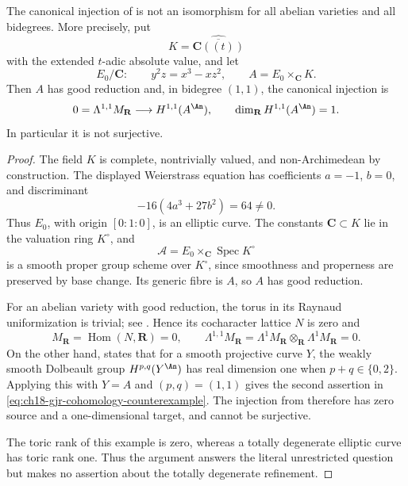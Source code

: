 \begin{proposition}\label{prop:ch18-gjr-cohomology-counterexample}
The canonical injection of \cite[\S1.15]{GJR26} is not an isomorphism for
all abelian varieties and all bidegrees.  More precisely, put
\[
 K=\widehat{\overline{\mathbf C((t))}}
\]
with the extended $t$-adic absolute value, and let
\[
 E_0/\mathbf C:\qquad y^2z=x^3-xz^2,
 \qquad A=E_0\times_{\mathbf C}K .
\]
Then $A$ has good reduction and, in bidegree $(1,1)$, the canonical
injection is
\begin{equation}
 0=\Lambda^{1,1}M_{\mathbf R}
 \longrightarrow H^{1,1}(A^{\An}),
 \qquad
\dim_{\mathbf R}H^{1,1}(A^{\An})=1.
\label{eq:ch18-gjr-cohomology-counterexample}
\end{equation}
In particular it is not surjective.
\end{proposition}

\begin{proof}
The field $K$ is complete, nontrivially valued, and non-Archimedean by
construction.  The displayed Weierstrass equation has coefficients
$a=-1$, $b=0$, and discriminant
\[
 -16(4a^3+27b^2)=64\ne0.
\]
Thus $E_0$, with origin $[0:1:0]$, is an elliptic curve.  The constants
$\mathbf C\subset K$ lie in the valuation ring $K^\circ$, and
\[
 \mathcal A=E_0\times_{\mathbf C}\operatorname{Spec}K^\circ
\]
is a smooth proper group scheme over $K^\circ$, since smoothness and
properness are preserved by base change.  Its generic fibre is $A$, so
$A$ has good reduction.

For an abelian variety with good reduction, the torus in its Raynaud
uniformization is trivial; see \cite[\S16]{GJR26}.  Hence its cocharacter
lattice $N$ is zero and
\[
 M_{\mathbf R}=\operatorname{Hom}(N,\mathbf R)=0,
 \qquad
 \Lambda^{1,1}M_{\mathbf R}
 =\Lambda^1M_{\mathbf R}\otimes_{\mathbf R}\Lambda^1M_{\mathbf R}=0.
\]
On the other hand, \cite[Theorem~1.14]{GJR26} states that for a smooth
projective curve $Y$, the weakly smooth Dolbeault group
$H^{p,q}(Y^{\An})$ has real dimension one when $p+q\in\{0,2\}$.
Applying this with $Y=A$ and $(p,q)=(1,1)$ gives the second assertion in
\eqref{eq:ch18-gjr-cohomology-counterexample}.  The injection from
\cite[\S1.15]{GJR26} therefore has zero source and a one-dimensional target,
and cannot be surjective.

The toric rank of this example is zero, whereas a totally degenerate elliptic
curve has toric rank one.  Thus the argument answers the literal unrestricted
question but makes no assertion about the totally degenerate refinement.
\end{proof}

